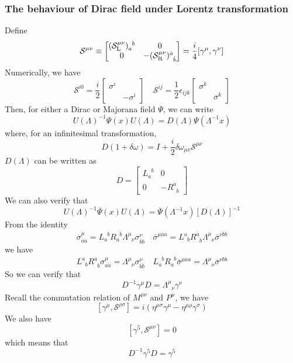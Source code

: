 \subsubsection{The behaviour of Dirac field under Lorentz transformation}
\noindent
Define
\[\mathcal{S}^{\mu \nu} \equiv \left[ \begin{matrix} (\mathcal{S}_{\rm L}^{\mu\nu})_a^{\phantom{a}b}& 0\\ 0& -(\mathcal{S}_{\rm R}^{\mu\nu})^{\dot{a}}_{\phantom{\dot{a}} \dot{b}}\end{matrix} \right] = \frac{i}{4}[\gamma^{\mu},\gamma^{\nu}] \]
Numerically, we have
\[\mathcal{S}^{i0} = \frac{i}{2} \left[ \begin{matrix} \sigma ^{i}& \\ & -\sigma ^{i}\end{matrix} \right] \quad \mathcal{S}^{ij} = \frac{1}{2} \epsilon_{ijk} \left[ \begin{matrix} \sigma ^{k}& \\ & \sigma ^{k}\end{matrix} \right] \]
Then, for either a Dirac or Majorana field $\Psi$, we can write
\[U(\Lambda)^{-1} \Psi(x) U(\Lambda) = D(\Lambda) \Psi(\Lambda^{-1}x)\]
where, for an infinitesimal transformation,
\[D(1+\delta \omega) = I + \frac{i}{2} \delta \omega_{\mu \nu} \mathcal{S}^{\mu \nu}\]
$D(\Lambda)$ can be written as
\[D = \left[ \begin{matrix} L_a^{\phantom{a}b}& 0\\ 0& -R^{\dot{a}}_{\phantom{\dot{a}} \dot{b}}\end{matrix} \right]  \]
We can also verify that
\[U(\Lambda)^{-1} \overline{\Psi}(x) U(\Lambda) = \overline{\Psi}(\Lambda^{-1}x)[D(\Lambda)]^{-1} \]
From the identity
\[\sigma^{\mu}_{a\dot{a}} = L_a^{\phantom{a}b} R_{\dot{a}}^{\phantom{\dot{a}} \dot{b}} \Lambda^{\mu}_{\phantom{\mu} \nu} \sigma^{\nu}_{b\dot{b}} \quad \overline{\sigma}^{\mu \dot{a} a} = L^a_{\phantom{a}b} R^{\dot{a}}_{\phantom{\dot{a}} \dot{b}} \Lambda^{\mu}_{\phantom{\mu} \nu} \overline{\sigma}^{\nu\dot{b}b}\]
we have
\[L^a_{\phantom{a}b} R^{\dot{a}}_{\phantom{\dot{a}} \dot{b}} \sigma^{\mu}_{a\dot{a}} =  \Lambda^{\mu}_{\phantom{\mu} \nu} \sigma^{\nu}_{b\dot{b}} \quad L_a^{\phantom{a}b} R_{\dot{a}}^{\phantom{\dot{a}} \dot{b}} \overline{\sigma}^{\mu \dot{a} a} =  \Lambda^{\mu}_{\phantom{\mu} \nu} \overline{\sigma}^{\nu\dot{b}b}\]
So we can verify that
\[D^{-1} \gamma^{\mu} D = \Lambda^{\mu}_{\phantom{\mu} \nu} \gamma^{\nu}\]
Recall the commutation relation of $M^{\mu \nu}$ and $P^{\mu}$, we have
\[[\gamma^{\mu},\mathcal{S}^{\rho \sigma}] = i(\eta^{\mu \sigma}\gamma^{\mu} - \eta^{\mu \rho}\gamma^{\sigma})\]
We also have
\[[\gamma^5,\mathcal{S}^{\mu \nu}] = 0\]
which means that
\[D^{-1} \gamma^{5} D =  \gamma^{5}\]

